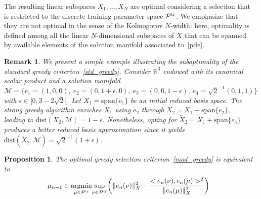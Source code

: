 \documentclass[12pt,a4paper]{article}
\newtheorem{proposition}{Proposition}
\newtheorem{remark}{Remark}
\newcommand{\Ptr}{\mathcal P^{\rm tr}}
\newcommand{\tr}{{\rm tr}}
\newcommand{\calP}{\mathcal P}
\begin{document}
The resulting linear subspaces $X_1,\ldots,X_N$ are optimal considering a selection that is restricted to the discrete training parameter space $\Ptr$. We emphasize that they are not optimal in the sense of the Kolmogorov $N$-width: here, optimality is defined among all the 
linear $N$-dimensional subspaces of $X$ that can be spanned by available elements of the solution manifold associated to~\eqref{pde}. 
\begin{remark}
We present a simple example illustrating the suboptimality of the standard greedy criterion~\eqref{std_greedy}.
Consider $\mathbb R^3$ endowed with its canonical scalar product and a solution manifold 
$ \mathcal M = \{e_1=(1,0,0),\ e_2 = (0,1+\epsilon,0),\ e_3 = (0,0,1-\epsilon),\
e_4 = \sqrt 2^{-1}(0,1,1)\}$ with $\epsilon \in [0, 3-2\sqrt 2[$.
Let $X_1= \mathrm{span}\{e_1\}$ be an initial reduced basis space. The strong greedy algorithm enriches $X_1$ using $e_2$ through $X_2 = X_1 + \mathrm{span}\{e_2\}$, leading to 
$\mathrm{dist}(X_2,\mathcal M) = 1-\epsilon$. Nonetheless, opting for $\tilde X_2 = X_1 + \mathrm{span}\{e_4\}$
produces a better reduced basis approximation since it yields $\mathrm{dist}(\tilde X_2,\mathcal M) = 
{\sqrt{2}}^{-1}(1+\epsilon)$.
\end{remark}

\begin{proposition}
The optimal greedy selection criterion~\eqref{mod_greedy} is equivalent to
\begin{equation}
\mu_{n+1} \in \underset{\mu \in \calP^\tr}{\mathrm{argmin}}
\underset{\nu \in \calP^\tr} {\mathrm{\ sup\ }}
\bigg( \|e_n(\nu)\|_X^2 -\frac{<e_n(\nu), e_n(\mu)>^2}{\|e_n(\mu)\|_X^2} \bigg)
\end{equation}
\end{proposition}
\end{document}
